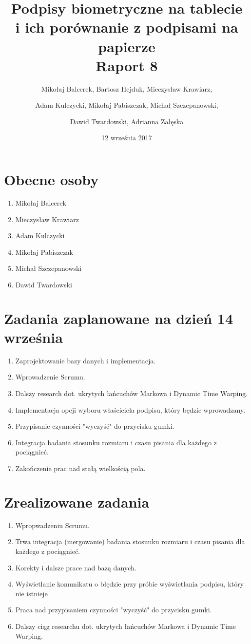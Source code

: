 \documentclass{mwrep}
\title{Podpisy biometryczne na tablecie \\ i ich porównanie z podpisami na papierze\\ 
Raport 8}
\author{Mikołaj Balcerek, Bartosz Hejduk, Mieczysław Krawiarz, \and Adam Kulczycki, Mikołaj Pabiszczak, Michał Szczepanowski, \and Dawid Twardowski, Adrianna Załęska}
\date{12 września 2017}
\begin{document}
\maketitle
{\let\clearpage\relax 
\chapter{Obecne osoby}}
\begin{enumerate}
    \item Mikołaj Balcerek
    \item Mieczysław Krawiarz
    \item Adam Kulczycki
    \item Mikołaj Pabiszczak
    \item Michał Szczepanowski
    \item Dawid Twardowski
\end{enumerate}


{\let\clearpage\relax 
\chapter{Zadania zaplanowane na dzień 14 września}}
\begin{enumerate}
	\item Zaprojektowanie bazy danych i implementacja.
	\item Wprowadzenie Scrumu.
	\item Dalszy research dot. ukrytych łańcuchów Markowa i Dynamic Time Warping.
	\item Implementacja opcji wyboru właściciela podpisu, który będzie wprowadzany.
	\item Przypisanie czynności "wyczyść" do przycisku gumki.
	\item Integracja badania stosunku rozmiaru i czasu pisania dla każdego z pociągnieć.
	\item Zakończenie prac nad stałą wielkością pola.
\end{enumerate}


{\let\clearpage\relax 
\chapter{Zrealizowane zadania}}
\begin{enumerate}
	\item Wpropwadzeniu Scrumu.
	\item Trwa integracja (mergowanie) badania stosunku rozmiaru i czasu pisania dla każdego z pociągnieć.
	\item Korekty i dalsze prace nad bazą danych.
	\item Wyświetlanie komunikatu o błędzie przy próbie wyświetlania podpisu, który nie istnieje
	\item Praca nad przypisaniem czynności "wyczyść" do przycisku gumki.
	\item Dalszy ciąg researchu dot. ukrytych łańcuchów Markowa i Dynamic Time Warping.
	 
	\end{enumerate}
\end{document}
